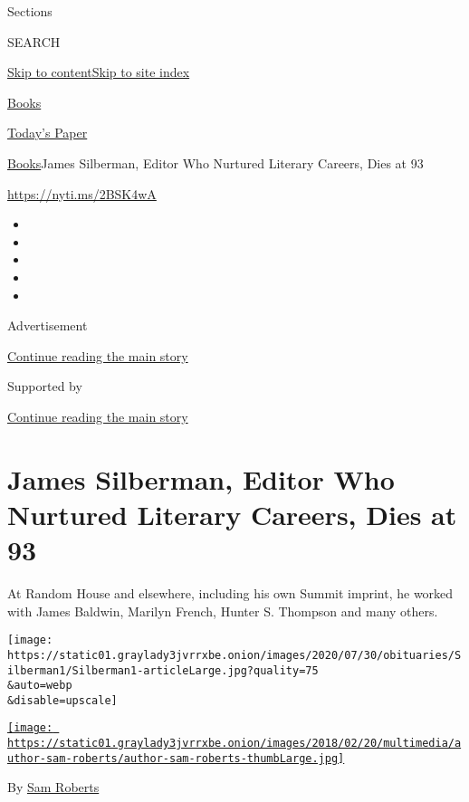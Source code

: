 Sections

SEARCH

\protect\hyperlink{site-content}{Skip to
content}\protect\hyperlink{site-index}{Skip to site index}

\href{https://www.nytimes3xbfgragh.onion/section/books}{Books}

\href{https://myaccount.nytimes3xbfgragh.onion/auth/login?response_type=cookie\&client_id=vi}{}

\href{https://www.nytimes3xbfgragh.onion/section/todayspaper}{Today's
Paper}

\href{/section/books}{Books}\textbar{}James Silberman, Editor Who
Nurtured Literary Careers, Dies at 93

\url{https://nyti.ms/2BSK4wA}

\begin{itemize}
\item
\item
\item
\item
\item
\end{itemize}

Advertisement

\protect\hyperlink{after-top}{Continue reading the main story}

Supported by

\protect\hyperlink{after-sponsor}{Continue reading the main story}

\hypertarget{james-silberman-editor-who-nurtured-literary-careers-dies-at-93}{%
\section{James Silberman, Editor Who Nurtured Literary Careers, Dies at
93}\label{james-silberman-editor-who-nurtured-literary-careers-dies-at-93}}

At Random House and elsewhere, including his own Summit imprint, he
worked with James Baldwin, Marilyn French, Hunter S. Thompson and many
others.

\texttt{[image: https://static01.graylady3jvrrxbe.onion/images/2020/07/30/obituaries/Silberman1/Silberman1-articleLarge.jpg?quality=75\\\&auto=webp\\\&disable=upscale]}

\href{https://www.nytimes3xbfgragh.onion/by/sam-roberts}{\texttt{[image: https://static01.graylady3jvrrxbe.onion/images/2018/02/20/multimedia/author-sam-roberts/author-sam-roberts-thumbLarge.jpg]}}

By \href{https://www.nytimes3xbfgragh.onion/by/sam-roberts}{Sam Roberts}

